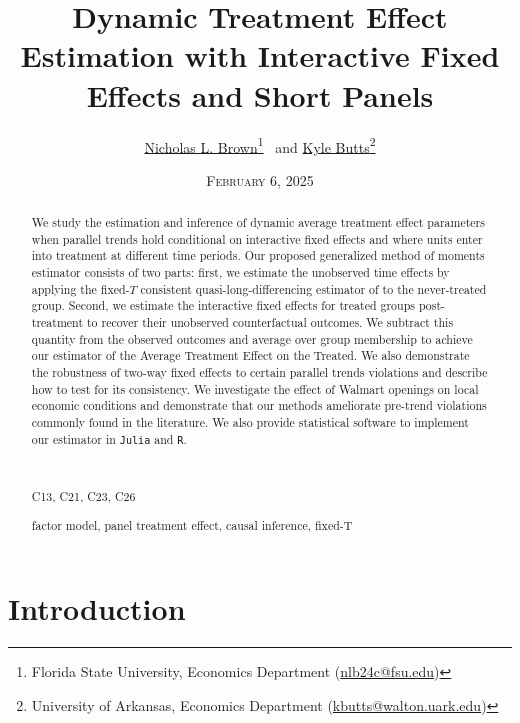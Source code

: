 \documentclass[12pt]{article}
\title{%
    Dynamic Treatment Effect Estimation with Interactive Fixed Effects and Short Panels
}
\author{%
  \href{https://sites.google.com/msu.edu/nicholasbrown}{Nicholas L. Brown}\thanks{Florida State University, Economics Department (\href{mailto:nlb24c@fsu.edu}{nlb24c@fsu.edu})}
  \ and 
  \href{https://kylebutts.com/}{Kyle Butts}\thanks{University of Arkansas, Economics Department (\href{mailto:kbutts@walton.uark.edu}{kbutts@walton.uark.edu})}
}
\date{\textsc{February 6, 2025}}
\begin{document}
\maketitle

\begin{abstract}
We study the estimation and inference of dynamic average treatment effect parameters when parallel trends hold conditional on interactive fixed effects and where units enter into treatment at different time periods. Our proposed generalized method of moments estimator consists of two parts: first, we estimate the unobserved time effects by applying the fixed-$T$ consistent quasi-long-differencing estimator of \citet{Ahn_Lee_Schmidt_2013} to the never-treated group. Second, we estimate the interactive fixed effects for treated groups post-treatment to recover their unobserved counterfactual outcomes. We subtract this quantity from the observed outcomes and average over group membership to achieve our estimator of the Average Treatment Effect on the Treated. We also demonstrate the robustness of two-way fixed effects to certain parallel trends violations and describe how to test for its consistency. We investigate the effect of Walmart openings on local economic conditions and demonstrate that our methods ameliorate pre-trend violations commonly found in the literature. We also provide statistical software to implement our estimator in \texttt{Julia} and \texttt{R}.
  
  \par~\par\noindent
   C13, C21, C23, C26
  \par
   factor model, panel treatment effect, causal inference, fixed-T
  \par\vspace{-2.5mm}
\end{abstract}

\newpage


\section{Introduction}
\end{document}
